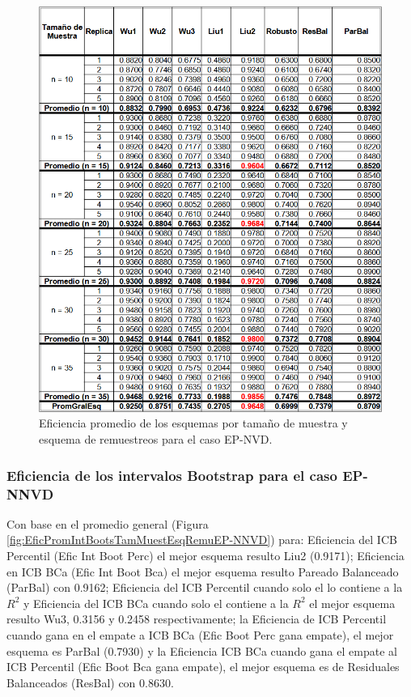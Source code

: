 \begin{figure}[ht] 
	\centering 
	\includegraphics[width=0.70\linewidth]{img/EP_NVD_Efic_Esq.png} 
	\caption{Eficiencia promedio de los esquemas por tamaño de muestra y esquema de remuestreos para el caso EP-NVD.} 
	\label{fig:EficPromEsqTamMuesEsqRemuEP-NVD}
\end{figure}
\FloatBarrier



\subsubsection{Eficiencia de los intervalos Bootstrap para el caso EP-NNVD}
Con base en el promedio general (Figura \ref{fig:EficPromIntBootsTamMuestEsqRemuEP-NNVD}) para: Eficiencia del ICB Percentil (Efic Int Boot Perc) el mejor esquema resulto Liu2 (0.9171); 
Eficiencia en ICB BCa (Efic Int Boot Bca) el mejor esquema resulto Pareado Balanceado (ParBal) con 0.9162;
 Eficiencia del ICB Percentil cuando solo el lo contiene a la $R^{2}$ y Eficiencia del ICB BCa cuando solo el contiene a la $R^{2}$ el mejor esquema resulto Wu3, 0.3156 y 0.2458 respectivamente;
 la Eficiencia de ICB Percentil cuando gana en el empate a ICB BCa (Efic Boot Perc gana empate), el mejor esquema es ParBal (0.7930) y la Eficiencia ICB BCa cuando gana el empate al ICB Percentil (Efic Boot Bca gana empate), el mejor esquema es de Residuales Balanceados (ResBal) con 0.8630.
\vspace{.5cm}


